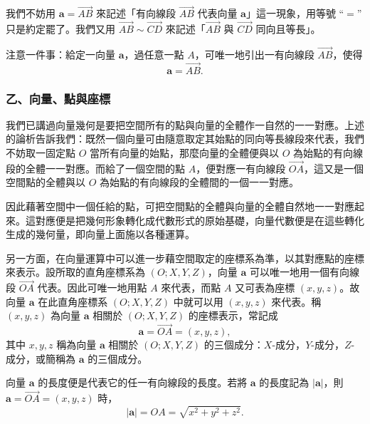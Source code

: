 我們不妨用 $\mathbf{a} = \vec{AB}$ 來記述「有向線段 $\vec{AB}$ 代表向量 $\mathbf{a}$」這一現象，用等號 ``$=$'' 只是約定罷了。我們又用 $\vec{AB} \sim \vec{CD}$ 來記述「$\vec{AB}$ 與 $\vec{CD}$ 同向且等長」。

注意一件事：給定一向量 $\mathbf{a}$，過任意一點 $A$，可唯一地引出一有向線段 $\vec{AB}$，使得
\[ \mathbf{a} = \vec{AB}. \]

\subsubsection*{乙、向量、點與座標}

我們已講過向量幾何是要把空間所有的點與向量的全體作一自然的一一對應。上述的論析告訴我們：既然一個向量可由隨意取定其始點的同向等長線段來代表，我們不妨取一固定點 $O$ 當所有向量的始點，那麼向量的全體便與以 $O$ 為始點的有向線段的全體一一對應。而給了一個空間的點 $A$，便對應一有向線段 $\vec{OA}$，這又是一個空間點的全體與以 $O$ 為始點的有向線段的全體間的一個一一對應。

因此藉著空間中一個任給的點，可把空間點的全體與向量的全體自然地一一對應起來。這對應便是把幾何形象轉化成代數形式的原始基礎，向量代數便是在這些轉化生成的幾何量，即向量上面施以各種運算。

另一方面，在向量運算中可以進一步藉空間取定的座標系為準，以其對應點的座標來表示。設所取的直角座標系為 $(O; X, Y, Z)$，向量 $\mathbf{a}$ 可以唯一地用一個有向線段 $\vec{OA}$ 代表。因此可唯一地用點 $A$ 來代表，而點 $A$ 又可表為座標 $(x, y, z)$。故向量 $\mathbf{a}$ 在此直角座標系 $(O; X, Y, Z)$ 中就可以用 $(x, y, z)$ 來代表。稱 $(x, y, z)$ 為向量 $\mathbf{a}$ 相關於 $(O; X, Y, Z)$ 的座標表示，常記成
\[ \mathbf{a} = \vec{OA} = (x, y, z), \]
其中 $x, y, z$ 稱為向量 $\mathbf{a}$ 相關於 $(O; X, Y, Z)$ 的三個成分：$X$-成分，$Y$-成分，$Z$-成分，或簡稱為 $\mathbf{a}$ 的三個成分。

向量 $\mathbf{a}$ 的長度便是代表它的任一有向線段的長度。若將 $\mathbf{a}$ 的長度記為 $|\mathbf{a}|$，則 $\mathbf{a} = \vec{OA} = (x, y, z)$ 時，
\[ |\mathbf{a}| = OA = \sqrt{x^2 + y^2 + z^2}. \]

